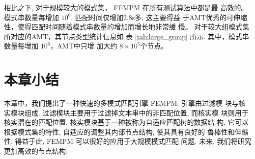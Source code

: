 \documentclass{ws-ijprai}
\begin{document}
相比之下, 对于规模较大的模式集， \textsf{FEMPM} 在所有测试算法中都是最
高效的。 模式串数量每增加 $10^6$, 匹配时间仅增加2.8s多, 这主要得益
于AMT优秀的可伸缩性，使得匹配时间随着模式串数量的增加而增长地非常缓
慢。 对于较大组模式集所对应的AMT，其节点类型统计信息如
表 \ref{tab:large_group} 所示. 其中，模式串数量每增加 $10^6$，AMT中只增
加大约 $8 \times 10^5$个节点。

\section{本章小结}
\label{sec:conclusion}

本章中，我们提出了一种快速的多模式匹配引擎 \textsf{FEMPM}. 引擎由过滤模
块与核实模块组成. 过滤模块主要用于过滤掉文本串中的非匹配位置, 而核实模
块则用于核实潜在的匹配位置. 核实模块基于一种被称为自适应匹配树的数据结
构, 它可以根据模式集的特性, 自适应的调整其内部节点结构, 使其具有良好的
鲁棒性和伸缩性. 得益于此, \textsf{FEMPM} 可以很好的应用于大规模模式匹配
问题. 未来, 我们将研究更加高效的节点结构.
\end{document}
